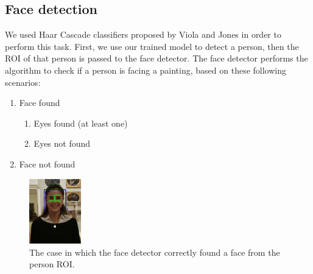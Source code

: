 \subsection{Face detection}
We used Haar Cascade classifiers \cite{haar_cascade} proposed by Viola and Jones in order to perform this task. First, we use our trained model to detect a person, then the ROI of that person is passed to the face detector. The face detector performs the algorithm to check if a person is facing a painting, based on these following scenarios:
\begin{enumerate}[label=\alph*)]
    \item Face found
    \begin{enumerate}[label=(\roman*)]
        \item \label{Eyes found} Eyes found (at least one)
        \item \label{Eyes not found} Eyes not found
    \end{enumerate}
    \item \label{Face not found} Face not found
\end{enumerate}

\begin{figure}[h!]
    \centering
    \includegraphics[width=0.2\textwidth]{pictures/face_detection/face_det2}
    \caption{The case in which the face detector correctly found a face from the person ROI.}
    \label{fig:Eyes}
\end{figure}

